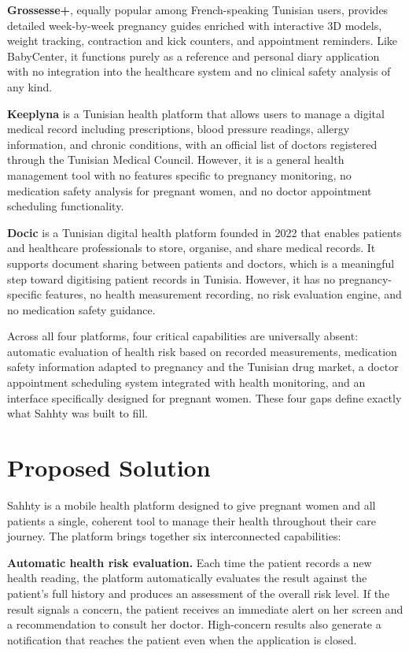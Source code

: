 \textbf{Grossesse+}, equally popular among French-speaking Tunisian users, provides
detailed week-by-week pregnancy guides enriched with interactive 3D models, weight
tracking, contraction and kick counters, and appointment reminders. Like BabyCenter,
it functions purely as a reference and personal diary application with no integration
into the healthcare system and no clinical safety analysis of any kind.

\textbf{Keeplyna} is a Tunisian health platform that allows users to manage a digital
medical record including prescriptions, blood pressure readings, allergy information,
and chronic conditions, with an official list of doctors registered through the Tunisian
Medical Council. However, it is a general health management tool with no features
specific to pregnancy monitoring, no medication safety analysis for pregnant women,
and no doctor appointment scheduling functionality.

\textbf{Docic} is a Tunisian digital health platform founded in 2022 that enables patients
and healthcare professionals to store, organise, and share medical records. It supports
document sharing between patients and doctors, which is a meaningful step toward
digitising patient records in Tunisia. However, it has no pregnancy-specific features,
no health measurement recording, no risk evaluation engine, and no medication
safety guidance.

Across all four platforms, four critical capabilities are universally absent: automatic
evaluation of health risk based on recorded measurements, medication safety information
adapted to pregnancy and the Tunisian drug market, a doctor appointment scheduling
system integrated with health monitoring, and an interface specifically designed for
pregnant women.
These four gaps define exactly what Sahhty was built to fill.

\section{Proposed Solution}

Sahhty is a mobile health platform designed to give pregnant women and all patients a
single, coherent tool to manage their health throughout their care journey. The platform
brings together six interconnected capabilities:

\textbf{Automatic health risk evaluation.} Each time the patient records a new health
reading, the platform automatically evaluates the result against the patient's full history
and produces an assessment of the overall risk level. If the result signals a concern, the
patient receives an immediate alert on her screen and a recommendation to consult her
doctor. High-concern results also generate a notification that reaches the patient even
when the application is closed.

